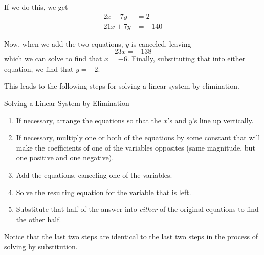 If we do this, we get
\begin{align*}
2x-7y &= 2\\
21x+7y &= -140
\end{align*}

Now, when we add the two equations, $y$ is canceled, leaving \[23x=-138\] which we can solve to find that $x=-6$.  Finally, substituting that into either equation, we find that $y=-2$.

This leads to the following steps for solving a linear system by elimination.
\begin{proc}{Solving a Linear System by Elimination}
\begin{enumerate}
\item If necessary, arrange the equations so that the $x$'s and $y$'s line up vertically.
\item If necessary, multiply one or both of the equations by some constant that will make the coefficients of one of the variables opposites (same magnitude, but one positive and one negative).
\item Add the equations, canceling one of the variables.
\item Solve the resulting equation for the variable that is left.
\item Substitute that half of the answer into \emph{either} of the original equations to find the other half.
\end{enumerate}
\end{proc}

Notice that the last two steps are identical to the last two steps in the process of solving by substitution.
\pagebreak

